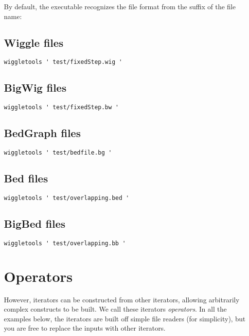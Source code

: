 \documentclass[12pt]{article}
\begin{document}
By default, the executable recognizes the file format from the suffix of the file name:

\subsection{Wiggle files}

\begin{verbatim}
wiggletools ' test/fixedStep.wig '
\end{verbatim}

\subsection{BigWig files}

\begin{verbatim}
wiggletools ' test/fixedStep.bw '
\end{verbatim}

\subsection{BedGraph files}

\begin{verbatim}
wiggletools ' test/bedfile.bg '
\end{verbatim}

\subsection{Bed files}

\begin{verbatim}
wiggletools ' test/overlapping.bed '
\end{verbatim}

\subsection{BigBed files}

\begin{verbatim}
wiggletools ' test/overlapping.bb '
\end{verbatim}

\section{Operators}

However, iterators can be constructed from other iterators, allowing arbitrarily complex constructs to be built. We call these iterators \emph{operators}. In all the examples below, the iterators are built off simple file readers (for simplicity), but you are free to replace the inputs with other iterators.
\end{document}
